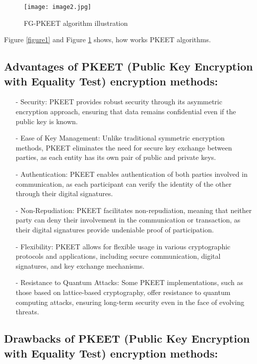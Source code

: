\documentclass[12pt]{article}
\begin{document}
\begin{figure}[H]
    \centering
    \texttt{[image: image2.jpg]}
    \caption{FG-PKEET algorithm illustration}
    \label{figure2}
\end{figure}
Figure \ref{figure1} and Figure \ref{figure2} shows, how works PKEET algorithms.
\subsection{Advantages of PKEET (Public Key Encryption with Equality Test) encryption methods:}

\begin{itemize}
    \item [-]Security: PKEET provides robust security through its asymmetric encryption approach, ensuring that data remains confidential even if the public key is known.
    \item [-]Ease of Key Management: Unlike traditional symmetric encryption methods, PKEET eliminates the need for secure key exchange between parties, as each entity has its own pair of public and private keys.
    \item [-]Authentication: PKEET enables authentication of both parties involved in communication, as each participant can verify the identity of the other through their digital signatures.
    \item[-]Non-Repudiation: PKEET facilitates non-repudiation, meaning that neither party can deny their involvement in the communication or transaction, as their digital signatures provide undeniable proof of participation.
    \item[-]Flexibility: PKEET allows for flexible usage in various cryptographic protocols and applications, including secure communication, digital signatures, and key exchange mechanisms.
    \item[-]Resistance to Quantum Attacks: Some PKEET implementations, such as those based on lattice-based cryptography, offer resistance to quantum computing attacks, ensuring long-term security even in the face of evolving threats.
    
\end{itemize}

\subsection{Drawbacks of PKEET (Public Key Encryption with Equality Test) encryption methods:} 
\end{document}
